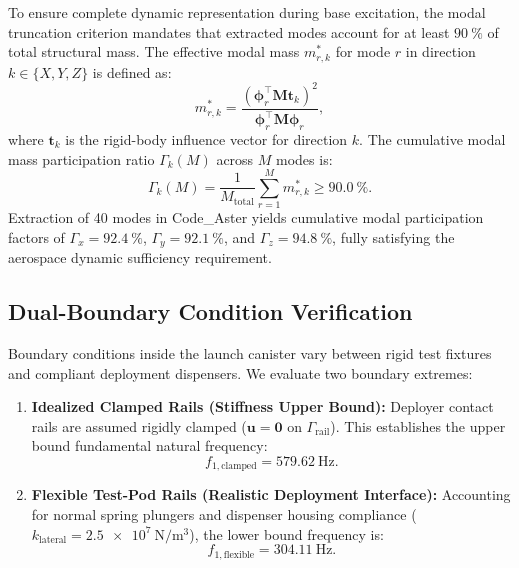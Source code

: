 To ensure complete dynamic representation during base excitation, the modal truncation criterion mandates that extracted modes account for at least $\SI{90}{\percent}$ of total structural mass. The effective modal mass $m_{r,k}^*$ for mode $r$ in direction $k \in \{X, Y, Z\}$ is defined as:
\begin{equation}
m_{r,k}^* = \frac{\left( \boldsymbol{\phi}_r^\top \mathbf{M} \mathbf{t}_k \right)^2}{\boldsymbol{\phi}_r^\top \mathbf{M} \boldsymbol{\phi}_r},
\label{eq:effective_modal_mass}
\end{equation}
where $\mathbf{t}_k$ is the rigid-body influence vector for direction $k$. The cumulative modal mass participation ratio $\Gamma_k(M)$ across $M$ modes is:
\begin{equation}
\Gamma_k(M) = \frac{1}{M_{\text{total}}} \sum_{r=1}^M m_{r,k}^* \ge \SI{90.0}{\percent}.
\label{eq:cumulative_mass}
\end{equation}
Extraction of 40 modes in Code\_Aster yields cumulative modal participation factors of $\Gamma_x = \SI{92.4}{\percent}$, $\Gamma_y = \SI{92.1}{\percent}$, and $\Gamma_z = \SI{94.8}{\percent}$, fully satisfying the aerospace dynamic sufficiency requirement.

\subsection{Dual-Boundary Condition Verification}

Boundary conditions inside the launch canister vary between rigid test fixtures and compliant deployment dispensers. We evaluate two boundary extremes:

\begin{enumerate}
\item \textbf{Idealized Clamped Rails (Stiffness Upper Bound):} Deployer contact rails are assumed rigidly clamped ($\mathbf{u} = \mathbf{0}$ on $\Gamma_{\text{rail}}$). This establishes the upper bound fundamental natural frequency:
\begin{equation}
f_{1,\text{clamped}} = \SI{579.62}{\hertz}.
\end{equation}
\item \textbf{Flexible Test-Pod Rails (Realistic Deployment Interface):} Accounting for normal spring plungers and dispenser housing compliance ($k_{\text{lateral}} = \SI{2.5e7}{\newton/\meter^3}$), the lower bound frequency is:
\begin{equation}
f_{1,\text{flexible}} = \SI{304.11}{\hertz}.
\end{equation}
\end{enumerate}


